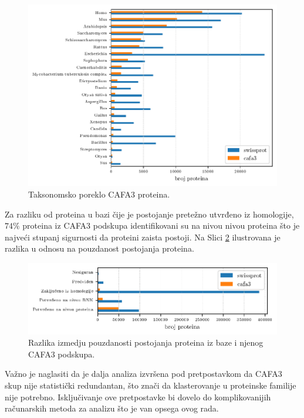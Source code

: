 \begin{figure}[th]
\centering
\hspace*{-3.0cm} 
\includegraphics[]{plots/sp_vs_cafa3}
\caption{Taksonomsko poreklo CAFA3 proteina. \\ \footnotesize 
}
\label{fig:sp_vs_cafa3}
\end{figure}

Za razliku od proteina u \swissprot bazi čije je postojanje pretežno utvrđeno
iz homologije, $74\%$ proteina iz CAFA3 podskupa identifikovani su na nivou
nivou proteina što je najveći stupanj sigurnosti da proteini zaista postoji. Na
Slici \ref{fig:cafa3_pe} ilustrovana je razlika u odnosu na pouzdanost
postojanja proteina. 



\begin{figure}[th]
\centering
\hspace*{-2.5cm} 
\includegraphics[]{plots/cafa3_pe}
\caption{Razlika izmedju pouzdanosti postojanja proteina iz \swissprot baze i njenog CAFA3 podskupa. }
\label{fig:cafa3_pe}
\end{figure}


Važno je naglasiti da je dalja analiza izvršena pod pretpostavkom da CAFA3 skup
nije statistički redundantan, što znači da klasterovanje u proteinske familije
nije potrebno.  Isključivanje ove pretpostavke bi dovelo do komplikovanijih
računarskih metoda za analizu što je van opsega ovog rada.



